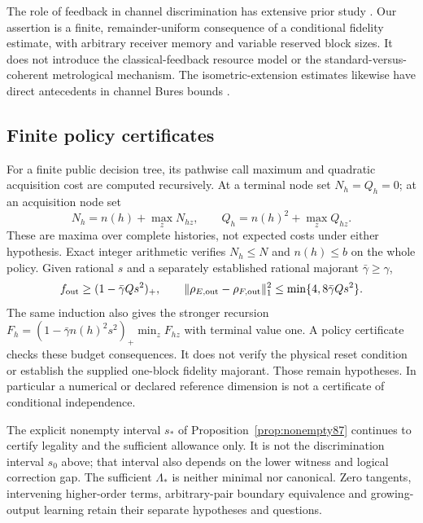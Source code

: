 The role of feedback in channel discrimination has extensive prior
study \cite[Theorem~9 and Remark~10]{SHW87}.  Our assertion is a
finite, remainder-uniform consequence of a conditional fidelity
estimate, with arbitrary receiver memory and variable reserved block
sizes.  It does not introduce the classical-feedback resource model
or the standard-versus-coherent metrological mechanism.  The
isometric-extension estimates likewise have direct antecedents in
channel Bures bounds \cite[Theorems~17 and~19]{HMNW88}.

\subsection{Finite policy certificates}
For a finite public decision tree, its pathwise call maximum and
quadratic acquisition cost are computed recursively.  At a terminal
node set $N_h=Q_h=0$; at an acquisition node set
\[
 N_h=n(h)+\max_zN_{hz},\qquad
 Q_h=n(h)^2+\max_zQ_{hz}.
\]
These are maxima over complete histories, not expected costs under
either hypothesis.  Exact integer arithmetic verifies $N_h\le N$
and $n(h)\le b$ on the whole policy.  Given rational $s$ and a
separately established rational majorant $\bar\gamma\ge\gamma$,
\[
 f_{\rm out}\ge(1-\bar\gamma Qs^2)_+,
 \qquad \|\rho_{E,\rm out}-\rho_{F,\rm out}\|_1^2
       \le\min\{4,8\bar\gamma Qs^2\}.
\]
The same induction also gives the stronger recursion
$F_h=(1-\bar\gamma n(h)^2s^2)_+\min_z F_{hz}$ with terminal
value one.  A policy certificate checks these budget consequences.  It does not
verify the physical reset condition or establish the supplied
one-block fidelity majorant.  Those remain hypotheses.  In
particular a numerical or declared reference dimension is not a
certificate of conditional independence.

The explicit nonempty interval $s_*$ of
Proposition~\ref{prop:nonempty87} continues to certify legality and
the sufficient allowance only.  It is not the discrimination
interval $s_0$ above; that interval also depends on the lower witness
and logical correction gap.  The sufficient $\Lambda_*$ is neither
minimal nor canonical.  Zero tangents, intervening higher-order
terms, arbitrary-pair boundary equivalence and growing-output
learning retain their separate hypotheses and questions.
